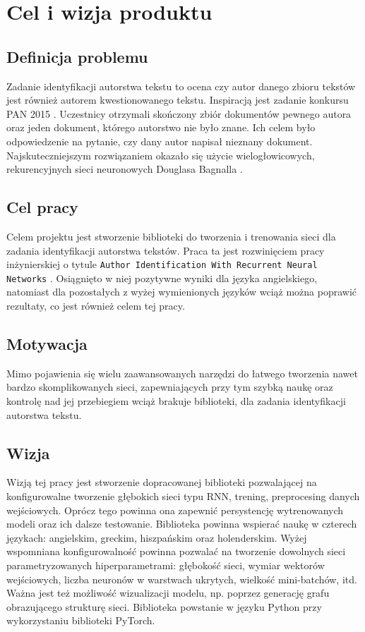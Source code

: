 \newpage
\section{Cel i wizja produktu}

\subsection{Definicja problemu}
Zadanie identyfikacji autorstwa tekstu to ocena czy autor danego zbioru tekstów jest również 
autorem kwestionowanego tekstu. Inspiracją jest zadanie konkursu PAN 2015 \cite{pan}. Uczestnicy otrzymali 
skończony zbiór dokumentów pewnego autora oraz jeden dokument, którego autorstwo nie było znane.
Ich celem było odpowiedzenie na pytanie, czy dany autor napisał nieznany dokument.
Najskuteczniejszym rozwiązaniem okazało się użycie wielogłowicowych, rekurencyjnych sieci 
neuronowych Douglasa Bagnalla \cite{bagnall}.

 
\subsection{Cel pracy}
Celem projektu jest stworzenie biblioteki do tworzenia i trenowania sieci dla zadania 
identyfikacji autorstwa tekstów. Praca ta jest rozwinięciem pracy inżynierskiej o tytule 
\texttt{Author Identification With Recurrent Neural Networks} \cite{radzio}. Osiągnięto w niej pozytywne wyniki dla języka 
angielskiego, natomiast dla pozostałych z wyżej wymienionych języków wciąż można poprawić rezultaty,
co jest również celem tej pracy.


\subsection{Motywacja}
Mimo pojawienia się wielu zaawansowanych narzędzi do łatwego tworzenia nawet bardzo skomplikowanych sieci, 
zapewniających przy tym szybką naukę oraz kontrolę nad jej przebiegiem wciąż brakuje biblioteki, dla zadania identyfikacji autorstwa 
tekstu.

\subsection{Wizja}
Wizją tej pracy jest stworzenie dopracowanej biblioteki pozwalającej na konfigurowalne tworzenie 
głębokich sieci typu RNN, trening, preprocesing danych wejściowych. Oprócz tego powinna ona 
zapewnić persystencję wytrenowanych modeli oraz ich dalsze testowanie. Biblioteka powinna wspierać 
naukę w czterech językach: angielskim, greckim, hiszpańskim oraz holenderskim. Wyżej wspomniana konfigurowalność powinna 
pozwalać na tworzenie dowolnych sieci parametryzowanych hiperparametrami: głębokość sieci, wymiar 
wektorów wejściowych, liczba neuronów w warstwach ukrytych, wielkość mini-batchów, itd. Ważna jest 
też możliwość wizualizacji modelu, np. poprzez generację grafu obrazującego strukturę sieci. 
Biblioteka powstanie w języku Python przy wykorzystaniu biblioteki PyTorch.

